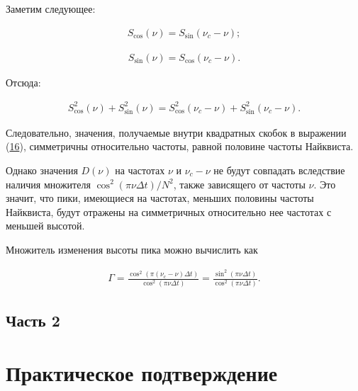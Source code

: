 \documentclass[12pt]{article}
\newcommand{\hl}[1]{(\hyperlink{eq:#1}{#1})}
\newcommand{\s}[2]{\hypertarget{skip:#1}{\vspace{#2pt}}}
\newcommand{\sd}[1]{\hypertarget{skip:#1}{\vspace{-10pt}}}
\newcommand{\hep}[2]{\vspace{#2pt}\hypertarget{eq:#1}{}\vspace{-#2pt}}
\newcommand{\hs}[1]{\sd{#1}\hep{#1}{18}}
\begin{document}
Заметим следующее:

\sd{23}
\begin{gather}
    S_{\cos}(\nu) = S_{\sin}(\nu_{c} - \nu);
\end{gather}

\s{24}{-20}
\begin{gather}
    S_{\sin}(\nu) = S_{\cos}(\nu_{c} - \nu).
\end{gather}

Отсюда:

\hs{25}
\begin{gather}
    S_{\cos}^2(\nu) + S_{\sin}^2(\nu) = S_{\cos}^2(\nu_{c} - \nu) + S_{\sin}^2(\nu_{c} - \nu).
\end{gather}

Следовательно, значения, получаемые внутри квадратных скобок в выражении \hl{16}, симметричны относительно частоты, равной половине частоты Найквиста. \par

\vspace{\baselineskip}

Однако значения $ D(\nu) $ на частотах $ \nu $ и $ \nu_{c} - \nu $ не будут совпадать вследствие наличия множителя $ \cos^2(\pi \nu \Delta t) / N^2 $, также зависящего от частоты $ \nu $. Это значит, что пики, имеющиеся на частотах, меньших половины частоты Найквиста, будут отражены на симметричных относительно нее частотах с меньшей высотой. \par

\vspace{\baselineskip}

Множитель изменения высоты пика можно вычислить как

\hs{26}
\begin{gather}
    \Gamma = \frac{\cos^2(\pi (\nu_{c} - \nu) \Delta t) }{\cos^2(\pi \nu \Delta t) } = \frac{\sin^2(\pi \nu \Delta t) }{\cos^2(\pi \nu \Delta t) }.
\end{gather}

\newpage

\subsection*{Часть 2}
\section*{Практическое подтверждение}
\setcounter{section}{2}
\setcounter{subsection}{0}

\vspace{18pt}
\end{document}
